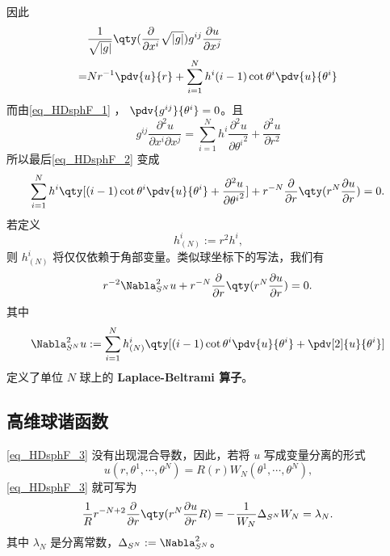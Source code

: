 因此
\begin{equation}
\begin{aligned}
&\frac{1}{\sqrt{ \left\lvert g \right\rvert }} \qty(\frac{\partial }{\partial x^i} \sqrt{ \left\lvert g \right\rvert })g^{ij} \frac{\partial u}{\partial x^j}\\
=&Nr^{-1}\pdv{u}{r}+\sum_{i=1}^{N}h^{i}(i-1)\cot\theta^i\pdv{u}{\theta^i}\\
\end{aligned}~
\end{equation}
而由\autoref{eq_HDsphF_1} ， $\pdv{g^{ij}}{\theta^i}=0$。且
\begin{equation}
g^{ij}\frac{\partial^2 u}{\partial x^i\partial x^j}=\sum_{i=1}^{N}h^{i}\frac{\partial^2 u}{\partial {\theta^i}^2}+\frac{\partial^2 u}{\partial r^2}~
\end{equation}
所以最后\autoref{eq_HDsphF_2} 变成
\begin{equation}
\begin{aligned}
\sum_{i=1}^{N}h^{i}\qty[(i-1)\cot\theta^i\pdv{u}{\theta^i}+\frac{\partial^2 u}{\partial {\theta^i}^2}]+r^{-N}\frac{\partial }{\partial r}\qty(r^{N}\frac{\partial u}{\partial r})=0.
\end{aligned}~
\end{equation}
若定义 
\begin{equation}\label{eq_HDsphF_6}
h^i_{(N)}:=r^2h^i,~
\end{equation}
则 $h^i_{(N)}$ 将仅仅依赖于角部变量。类似球坐标下的写法，我们有
\begin{equation}\label{eq_HDsphF_3}
r^{-2}\Nabla^{2}_{S^N}u+r^{-N}\frac{\partial }{\partial r}\qty(r^{N}\frac{\partial u}{\partial r})=0.~
\end{equation}
其中
\begin{equation}\label{eq_HDsphF_5}
\Nabla^{2}_{S^N}u:=\sum_{i=1}^N h^{i}_{(N)}\qty[(i-1)\cot\theta^i\pdv{u}{\theta^i}+\pdv[2]{u}{\theta^i}]~
\end{equation}
定义了单位 $N$ 球上的 \textbf{Laplace-Beltrami 算子}。
\subsection{高维球谐函数}
\autoref{eq_HDsphF_3} 没有出现混合导数，因此，若将 $u$ 写成变量分离的形式
\begin{equation}
u(r,\theta^1,\cdots,\theta^N)=R(r)W_N(\theta^1,\cdots,\theta^N),~
\end{equation}
\autoref{eq_HDsphF_3} 就可写为
\begin{equation}\label{eq_HDsphF_4}
\frac{1}{R}r^{-N+2}\frac{\partial }{\partial r}\qty(r^{N}\frac{\partial u}{\partial r}R)=-\frac{1}{W_N}\Delta_{S^N}W_N=\lambda_N.~
\end{equation}
其中 $\lambda_N$ 是分离常数，$\Delta_{S^N}:=\Nabla_{S^N}^2$。

